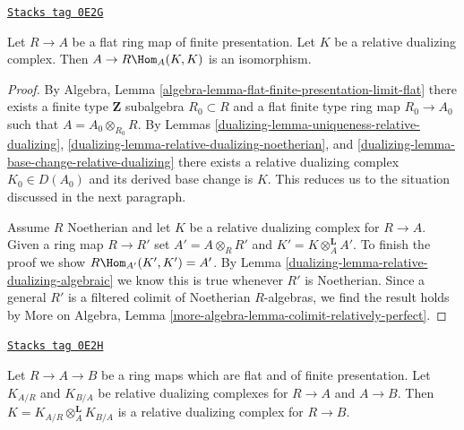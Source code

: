 \begin{lemma}
\label{dualizing-lemma-relative-dualizing-RHom}
\href{https://stacks.math.columbia.edu/tag/0E2G}{\texttt{Stacks tag 0E2G}}

Let $R \to A$ be a flat ring map of finite presentation.
Let $K$ be a relative dualizing complex.
Then $A \to R\Hom_A(K, K)$ is an isomorphism.
\end{lemma}

\begin{proof}

By
Algebra, Lemma \ref{algebra-lemma-flat-finite-presentation-limit-flat}
there exists a finite type $\mathbf{Z}$ subalgebra $R_0 \subset R$
and a flat finite type ring map $R_0 \to A_0$ such that
$A = A_0 \otimes_{R_0} R$. By Lemmas
\ref{dualizing-lemma-uniqueness-relative-dualizing},
\ref{dualizing-lemma-relative-dualizing-noetherian}, and
\ref{dualizing-lemma-base-change-relative-dualizing}
there exists a relative dualizing complex $K_0 \in D(A_0)$
and its derived base change is $K$.
This reduces us to the situation discussed in the next paragraph.

\medskip\noindent
Assume $R$ Noetherian and let $K$ be a relative dualizing complex
for $R \to A$. Given a ring map $R \to R'$ set $A' = A \otimes_R R'$
and $K' = K \otimes_A^\mathbf{L} A'$. To finish the proof we show
$R\Hom_{A'}(K', K') = A'$. By Lemma \ref{dualizing-lemma-relative-dualizing-algebraic}
we know this is true whenever $R'$ is Noetherian.
Since a general $R'$ is a filtered colimit of Noetherian
$R$-algebras, we find the result holds by
More on Algebra, Lemma \ref{more-algebra-lemma-colimit-relatively-perfect}.
\end{proof}

\begin{lemma}
\label{dualizing-lemma-relative-dualizing-composition}
\href{https://stacks.math.columbia.edu/tag/0E2H}{\texttt{Stacks tag 0E2H}}

Let $R \to A \to B$ be a ring maps which are flat and of finite presentation.
Let $K_{A/R}$ and $K_{B/A}$ be relative dualizing complexes for $R \to A$
and $A \to B$. Then $K = K_{A/R} \otimes_A^\mathbf{L} K_{B/A}$
is a relative dualizing complex for $R \to B$.
\end{lemma}

